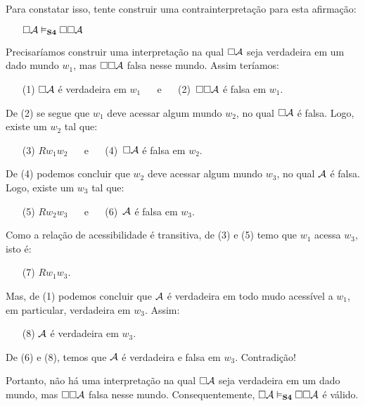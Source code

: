 Para constatar isso, tente construir uma contrainterpretação para esta afirmação:
\begin{itemize}
	\item[]$\Box\mathcal{A} \vDash_{\mathbf{S4}} \Box \Box \mathcal{A}$
\end{itemize}
 

 Precisaríamos construir uma interpretação na qual $\Box\mathcal{A}$ seja verdadeira em um dado mundo  $w_1$, mas  $\Box \Box \mathcal{A}$  falsa nesse mundo. Assim teríamos: 
 \begin{itemize}
	\item[(1)]  $\Box\mathcal{A}$ é verdadeira em $w_1$ \,\,\,\,\,\,  e \,\,\,\,\,\,  (2)\, $\Box \Box \mathcal{A}$  é  falsa em  $w_1$.
\end{itemize} 
De (2) se segue que $w_1$ deve acessar algum mundo $w_2$, no qual $\Box\mathcal{A}$ é falsa.  Logo, existe um $w_2$ tal que: 
\begin{itemize}
	\item[(3)]  $Rw_1w_2$  \,\,\,\,\,\,  e \,\,\,\,\,\,  (4)\, $\Box\mathcal{A}$ é falsa em $w_2$.
\end{itemize}
De (4) podemos concluir que $w_2$ deve acessar algum mundo  $w_3$, no qual $\mathcal{A}$ é falsa. 
Logo, existe um $w_3$ tal que:
\begin{itemize}
	\item[(5)]  $Rw_2w_3$  \,\,\,\,\,\, e  \,\,\,\,\,\, (6)\,  $\mathcal{A}$ é falsa em $w_3$.
\end{itemize}
Como a relação de acessibilidade é transitiva, de (3) e (5) temo que $w_1$ acessa $w_3$, isto é: 
\begin{itemize}
	\item[(7)]  $Rw_1w_3$.
\end{itemize}
Mas,  de (1) podemos concluir que  $\mathcal{A}$  é verdadeira em todo mudo acessível a $w_1$, em particular, verdadeira em $w_3$. Assim: 
\begin{itemize}
	\item[(8)]  $\mathcal{A}$  é verdadeira em $w_3$.
\end{itemize}
 De (6) e (8), temos que  $\mathcal{A}$ é verdadeira e falsa em $w_3$. Contradição!  
  

Portanto, não há uma interpretação  na qual $\Box\mathcal{A}$ seja verdadeira em um dado mundo, mas  $\Box \Box \mathcal{A}$  falsa nesse mundo. Consequentemente,  $\Box\mathcal{A} \vDash_{\mathbf{S4}} \Box\Box\mathcal{A}$ é válido.



